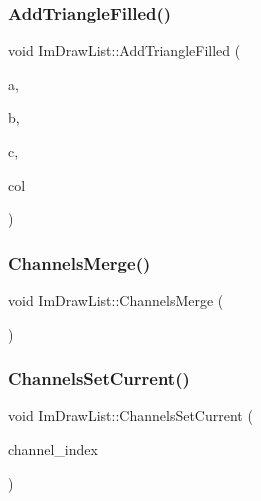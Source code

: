 \subsubsection{\texorpdfstring{Add\+Triangle\+Filled()}{AddTriangleFilled()}}
{\footnotesize\ttfamily void Im\+Draw\+List\+::\+Add\+Triangle\+Filled (\begin{DoxyParamCaption}\item[{const \hyperlink{struct_im_vec2}{Im\+Vec2} \&}]{a,  }\item[{const \hyperlink{struct_im_vec2}{Im\+Vec2} \&}]{b,  }\item[{const \hyperlink{struct_im_vec2}{Im\+Vec2} \&}]{c,  }\item[{Im\+U32}]{col }\end{DoxyParamCaption})}

\hypertarget{struct_im_draw_list_a2ed82c3f663cda520c90c55b94196274}{}\label{struct_im_draw_list_a2ed82c3f663cda520c90c55b94196274} 
\subsubsection{\texorpdfstring{Channels\+Merge()}{ChannelsMerge()}}
{\footnotesize\ttfamily void Im\+Draw\+List\+::\+Channels\+Merge (\begin{DoxyParamCaption}{ }\end{DoxyParamCaption})}

\hypertarget{struct_im_draw_list_a7de44b9fdfce65f32063ecad9306a191}{}\label{struct_im_draw_list_a7de44b9fdfce65f32063ecad9306a191} 
\subsubsection{\texorpdfstring{Channels\+Set\+Current()}{ChannelsSetCurrent()}}
{\footnotesize\ttfamily void Im\+Draw\+List\+::\+Channels\+Set\+Current (\begin{DoxyParamCaption}\item[{int}]{channel\+\_\+index }\end{DoxyParamCaption})}

\hypertarget{struct_im_draw_list_a426f124ba049bed2d38c850c65f9f917}{}\label{struct_im_draw_list_a426f124ba049bed2d38c850c65f9f917} 
